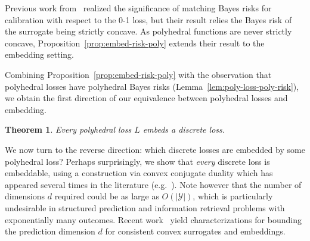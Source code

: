 \documentclass[11pt]{article}
\newcommand{\Comments}{1}
\newcommand{\mytodo}[2]{\ifnum\Comments=1%
  \todo[linecolor=#1!80!black,backgroundcolor=#1,bordercolor=#1!80!black]{#2}\fi}
\newcommand{\raft}[1]{\mytodo{green!20!white}{RF: #1}}
\newcommand{\Y}{\mathcal{Y}}
\newtheorem{theorem}{Theorem}
\begin{document}
Previous work from~\citet[Proposition 4]{duchi2018multiclass} realized the significance of matching Bayes risks for calibration with respect to the 0-1 loss, but their result relies the Bayes risk of the surrogate being strictly concave.  As polyhedral functions are never strictly concave, Proposition~\ref{prop:embed-risk-poly} extends their result to the embedding setting.


Combining Proposition~\ref{prop:embed-risk-poly} with the observation that polyhedral losses have polyhedral Bayes risks (Lemma~\ref{lem:poly-loss-poly-risk}), we obtain the first direction of our equivalence between polyhedral losses and embedding.

\begin{theorem}\label{thm:poly-embeds-discrete}
  Every polyhedral loss $L$ embeds a discrete loss.
\end{theorem}

We now turn to the reverse direction: which discrete losses are embedded by some polyhedral loss?
Perhaps surprisingly, we show that \emph{every} discrete loss is embeddable,
using a construction via convex conjugate duality which has appeared several times in the literature (e.g.\ \cite{duchi2018multiclass,abernethy2013efficient,frongillo2014general}).
Note however that the number of dimensions $d$ required could be as large as $O(|\Y|)$, which is particularly undesirable in structured prediction and information retrieval problems with exponentially many outcomes.
Recent work~\citep{ramaswamy2016convex,finocchiaro2020embedding,finocchiaro2021unifying} yield characterizations for bounding the prediction dimension $d$ for consistent convex surrogates and embeddings.
\end{document}
